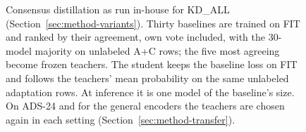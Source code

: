 \begin{figure}[tb]
\caption[Consensus distillation as run in-house for KD\_ALL]{Consensus distillation as run in-house for KD\_ALL
(Section~\ref{sec:method-variants}). Thirty baselines
are trained on FIT and ranked by their agreement, own vote included, with the
30-model majority on unlabeled A+C rows; the five most agreeing become frozen
teachers. The student keeps the baseline loss on FIT and follows the
teachers' mean probability on the same unlabeled adaptation rows. At
inference it is one model of the baseline's size. On ADS-24 and for the
general encoders the teachers are chosen again in each setting
(Section~\ref{sec:method-transfer}).}
\label{fig:cd}
\end{figure}
